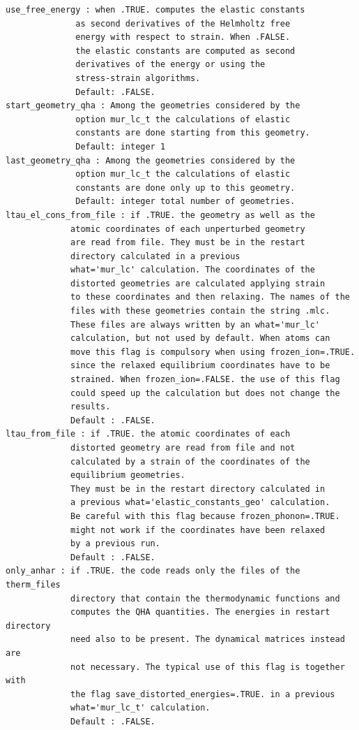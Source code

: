 \documentclass[12pt,a4paper,twoside]{report}
\begin{document}
\begin{verbatim}
use_free_energy : when .TRUE. computes the elastic constants 
              as second derivatives of the Helmholtz free 
              energy with respect to strain. When .FALSE. 
              the elastic constants are computed as second 
              derivatives of the energy or using the 
              stress-strain algorithms.
              Default: .FALSE.
start_geometry_qha : Among the geometries considered by the 
              option mur_lc_t the calculations of elastic 
              constants are done starting from this geometry.
              Default: integer 1
last_geometry_qha : Among the geometries considered by the 
              option mur_lc_t the calculations of elastic 
              constants are done only up to this geometry.
              Default: integer total number of geometries.
ltau_el_cons_from_file : if .TRUE. the geometry as well as the
             atomic coordinates of each unperturbed geometry
             are read from file. They must be in the restart
             directory calculated in a previous 
             what='mur_lc' calculation. The coordinates of the
             distorted geometries are calculated applying strain
             to these coordinates and then relaxing. The names of the 
             files with these geometries contain the string .mlc.
             These files are always written by an what='mur_lc' 
             calculation, but not used by default. When atoms can
             move this flag is compulsory when using frozen_ion=.TRUE.
             since the relaxed equilibrium coordinates have to be
             strained. When frozen_ion=.FALSE. the use of this flag
             could speed up the calculation but does not change the
             results. 
             Default : .FALSE.
ltau_from_file : if .TRUE. the atomic coordinates of each 
             distorted geometry are read from file and not 
             calculated by a strain of the coordinates of the 
             equilibrium geometries. 
             They must be in the restart directory calculated in 
             a previous what='elastic_constants_geo' calculation.
             Be careful with this flag because frozen_phonon=.TRUE.
             might not work if the coordinates have been relaxed
             by a previous run.
             Default : .FALSE.
only_anhar : if .TRUE. the code reads only the files of the therm_files
             directory that contain the thermodynamic functions and 
             computes the QHA quantities. The energies in restart directory
             need also to be present. The dynamical matrices instead are 
             not necessary. The typical use of this flag is together with
             the flag save_distorted_energies=.TRUE. in a previous 
             what='mur_lc_t' calculation.
             Default : .FALSE.
\end{verbatim}
\end{document}
